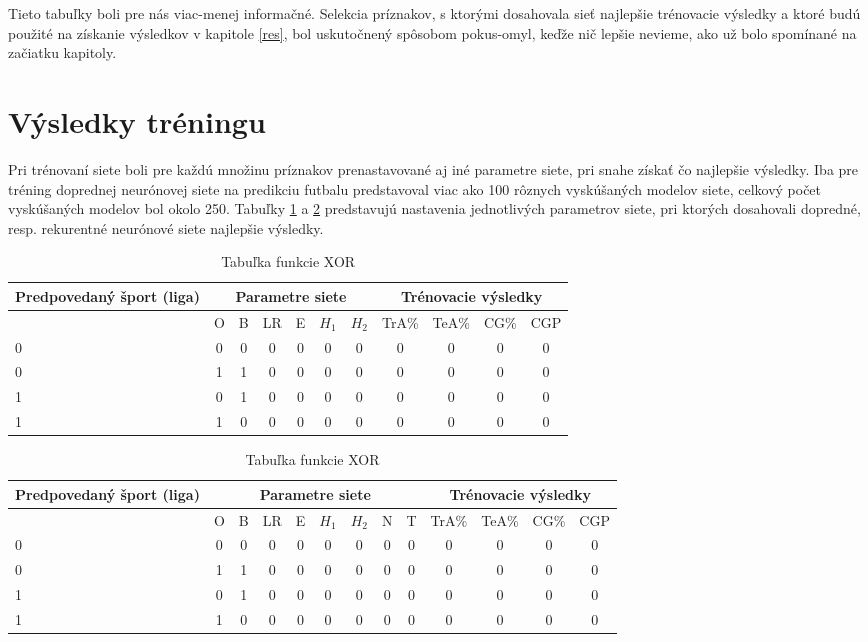 Tieto tabuľky boli pre nás viac-menej informačné. 
Selekcia príznakov, s ktorými dosahovala sieť najlepšie trénovacie výsledky a ktoré budú použité na získanie výsledkov v kapitole \ref{res}, bol uskutočnený spôsobom pokus-omyl, keďže nič lepšie nevieme, ako už bolo spomínané na začiatku kapitoly.

\section{Výsledky tréningu}
Pri trénovaní siete boli pre každú množinu príznakov prenastavované aj iné parametre siete, pri snahe získať čo najlepšie výsledky.
Iba pre tréning doprednej neurónovej siete na predikciu futbalu predstavoval viac ako 100 rôznych vyskúšaných modelov siete, celkový počet vyskúšaných modelov bol okolo 250.
Tabuľky \ref{ff_train_res} a \ref{rnn_train_res} predstavujú nastavenia jednotlivých parametrov siete, pri ktorých dosahovali dopredné, resp. rekurentné neurónové siete najlepšie výsledky.

\begin{table}[h]
\begin{center}
\begin{tabular}{ p{7em}|c|c|c|c|c|c|c|c|c|c| } 
 Predpovedaný šport (liga) & \multicolumn{6}{|c|}{Parametre siete} & \multicolumn{4}{|c|}{Trénovacie výsledky}  \\ 
 \hline
  & O & B & LR & E & $H_1$ & $H_2$ & TrA\% & TeA\% & CG\% & CGP \\
 \hline \hline
 0 & 0 & 0 & 0 & 0 & 0 & 0 & 0 & 0 & 0 & 0 \\ 
 0 & 1 & 1 & 0 & 0 & 0 & 0 & 0 & 0 & 0 & 0 \\ 
 1 & 0 & 1 & 0 & 0 & 0 & 0 & 0 & 0 & 0 & 0 \\ 
 1 & 1 & 0 & 0 & 0 & 0 & 0 & 0 & 0 & 0 & 0 \\ 
 \hline
\end{tabular}
\caption{Tabuľka funkcie XOR}
\label{ff_train_res}
\end{center}
\end{table}

\begin{table}[h]
\begin{center}
\begin{tabular}{ p{7em}|c|c|c|c|c|c|c|c|c|c|c|c| } 
 Predpovedaný šport (liga) & \multicolumn{8}{|c|}{Parametre siete} & \multicolumn{4}{|c|}{Trénovacie výsledky}  \\ 
 \hline
  & O & B & LR & E & $H_1$ & $H_2$ & N & T & TrA\% & TeA\% & CG\% & CGP \\
 \hline \hline
 0 & 0 & 0 & 0 & 0 & 0 & 0 & 0 & 0 & 0 & 0 & 0 & 0 \\ 
 0 & 1 & 1 & 0 & 0 & 0 & 0 & 0 & 0 & 0 & 0 & 0 & 0 \\ 
 1 & 0 & 1 & 0 & 0 & 0 & 0 & 0 & 0 & 0 & 0 & 0 & 0 \\ 
 1 & 1 & 0 & 0 & 0 & 0 & 0 & 0 & 0 & 0 & 0 & 0 & 0 \\ 
 \hline
\end{tabular}
\caption{Tabuľka funkcie XOR}
\label{rnn_train_res}
\end{center}
\end{table}
